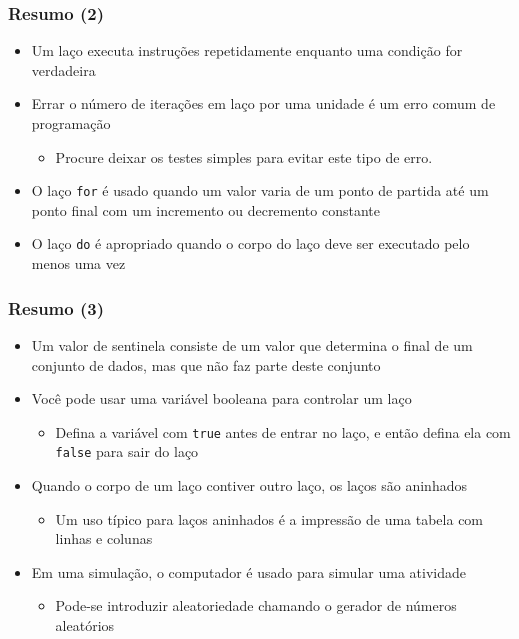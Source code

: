 \documentclass[xcolor={dvipsnames,table},aspectratio=169]{beamer}
\begin{document}
\begin{frame}\frametitle{Resumo (2)}
\begin{itemize}
	\item Um laço executa instruções repetidamente enquanto uma condição for verdadeira
	\item Errar o número de iterações em laço por uma unidade é um erro comum de programação
	\begin{itemize}
		\item Procure deixar os testes simples para evitar este tipo de erro.
	\end{itemize}
	\item O laço \texttt{for} é usado quando um valor varia de um ponto de partida até um ponto final com um incremento ou decremento constante
	\item O laço \texttt{do} é apropriado quando o corpo do laço deve ser executado pelo menos uma vez
\end{itemize}
\end{frame}

\begin{frame}\frametitle{Resumo (3)}
\begin{itemize}
	\item Um valor de sentinela consiste de um valor que determina o final de um conjunto de dados, mas que não faz parte deste conjunto
	\item Você pode usar uma variável booleana para controlar um laço
	\begin{itemize}
		\item Defina a variável com \texttt{true} antes de entrar no laço, e então defina ela com \texttt{false} para sair do laço
	\end{itemize}
	\item Quando o corpo de um laço contiver outro laço, os laços são aninhados
	\begin{itemize}
		\item Um uso típico para laços aninhados é a impressão de uma tabela com linhas e colunas
	\end{itemize}
	\item Em uma simulação, o computador é usado para simular uma atividade
	\begin{itemize}
		\item Pode-se introduzir aleatoriedade chamando o gerador de números aleatórios
	\end{itemize}
\end{itemize}
\end{frame}
\end{document}
